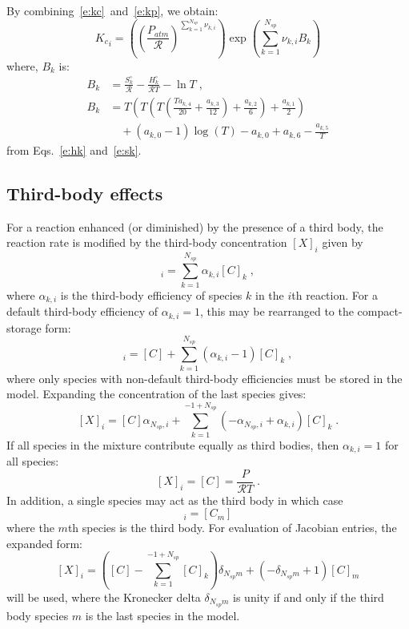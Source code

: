 \documentclass[12pt]{article}
\newcommand{\ns}{\ensuremath{{N_{sp}}}}
\newcommand{\Ru}{\ensuremath{\mathcal{R}}}
\begin{document}
By combining~\eqref{e:kc}~and~\eqref{e:kp}, we obtain:
\begin{equation}
 \label{e:kc_in_kp}
 {K_c}_{i} = \left(\left(\frac{P_{atm}}{\Ru}\right)^{\sum_{k=1}^{\ns} \nu_{k,i}}\right) \operatorname{exp}\left({\sum_{k=1}^{\ns} \nu_{k,i} B_{k}}\right)
\end{equation}
where, $B_k$ is:
\begin{align}
 \label{e:Bk}
 B_{k} &= \frac{S^{\circ}_k}{\Ru} - \frac{H^{\circ}_k}{\Ru T} - \ln{T} \nonumber\; , \\
 B_{k} &= T \left(T \left(T \left(\frac{T a_{k,4}}{20} + \frac{a_{k,3}}{12}\right) + \frac{a_{k,2}}{6}\right) + \frac{a_{k,1}}{2}\right) \nonumber \\
       & \quad + \left(a_{k,0} - 1\right) \log{\left (T \right )} - a_{k,0} + a_{k,6} - \frac{a_{k,5}}{T}
\end{align}
from Eqs.~\eqref{e:hk} and~\eqref{e:sk}.

\subsection{Third-body effects}
\label{s:thdbody}

For a reaction enhanced (or diminished) by the presence of a third body, the reaction rate is modified by the third-body concentration $[X]_i$ given by
\begin{equation}
[X]_{i} = \sum_{k=1}^{\ns} \alpha_{k,i} [C]_{k} \;,
\end{equation}
where $\alpha_{k,i}$ is the third-body efficiency of species $k$ in the $i$th reaction.
For a default third-body efficiency of $\alpha_{k,i} = 1$, this may be rearranged to the compact-storage form:
\begin{equation}
 [X]_{i} = [C] + \sum_{k=1}^{\ns} \left(\alpha_{k,i} - 1\right) [C]_{k} \;,
\end{equation}
where only species with non-default third-body efficiencies must be stored in the model.
Expanding the concentration of the last species gives:
\begin{equation}
\label{e:thd_mix}
 [X]_{i}=[C] \alpha_{\ns,i} + \sum_{k=1}^{-1 + \ns} \left(- \alpha_{\ns,i} + \alpha_{k,i}\right) [C]_{k}\;.
\end{equation}
If all species in the mixture contribute equally as third bodies, then $\alpha_{k,i} = 1$ for all species:
\begin{equation}
\label{e:thd_unity}
 [X]_{i} = [C] = \frac{P}{\Ru T} \;.
\end{equation}
In addition, a single species may act as the third body in which case
\begin{equation}
 [X]_{i} = [C_m]
\end{equation}
where the $m$th species is the third body.
For evaluation of Jacobian entries, the expanded form:
\begin{equation}
\label{e:thd_spec}
 [X]_{i}=\left([C] - \sum_{k=1}^{-1 + \ns} [C]_{k}\right) \delta_{\ns m} + \left(- \delta_{\ns m} + 1\right) [C]_{m}
\end{equation}
will be used, where the Kronecker delta $\delta_{\ns m}$ is unity if and only if the third body species $m$ is the last species in the model.
\end{document}
